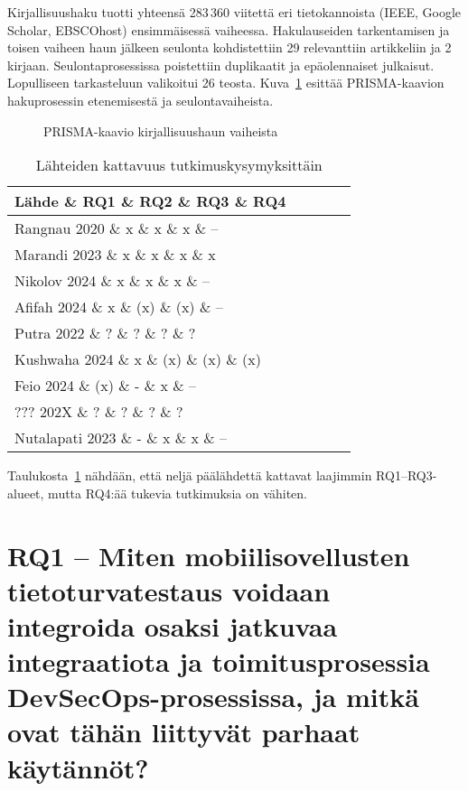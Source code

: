 \documentclass[bscthesis,finnish,oneside,biblatex]{uefcsthesis}
\begin{document}
Kirjallisuushaku tuotti yhteensä 283\,360 viitettä eri tietokannoista (IEEE, Google Scholar, EBSCOhost) ensimmäisessä vaiheessa.
Hakulauseiden tarkentamisen ja toisen vaiheen haun jälkeen seulonta kohdistettiin 29 relevanttiin artikkeliin ja 2 kirjaan.
Seulontaprosessissa poistettiin duplikaatit ja epäolennaiset julkaisut. Lopulliseen tarkasteluun valikoitui 26 teosta.
Kuva~\ref{fig:prisma} esittää PRISMA-kaavion hakuprosessin etenemisestä ja seulontavaiheista.


\begin{figure}[h]
  \centering
  \caption{PRISMA-kaavio kirjallisuushaun vaiheista}
  \label{fig:prisma}
\end{figure}

\begin{table}[h]
  \caption{Lähteiden kattavuus tutkimuskysymyksittäin}
  \label{tab:rq_matrix}
  \footnotesize
  \begin{tabular}{lcccc}
    \toprule
    Lähde \& RQ1 \& RQ2 \& RQ3 \& RQ4 \\
    \midrule
    Rangnau 2020 \& x \& x \& x \& – \\
    Marandi 2023 \& x \& x \& x \& x \\
    Nikolov 2024 \& x \& x \& x \& – \\
    Afifah 2024  \& x \& (x) \& (x) \& – \\
    Putra 2022  \& ? \& ? \& ? \& ? \\
    Kushwaha 2024  \& x \& (x) \& (x) \& (x) \\
    Feio  2024  \& (x) \& - \& x \& – \\
    ??? 202X   \& ? \& ? \& ? \& ? \\
    Nutalapati 2023  \& - \& x \& x \& – \\
    \bottomrule
  \end{tabular}
\end{table}

Taulukosta~\ref{tab:rq_matrix} nähdään, että neljä päälähdettä
kattavat laajimmin RQ1–RQ3-alueet, mutta RQ4:ää tukevia tutkimuksia on
vähiten.

\section{RQ1 – Miten mobiilisovellusten tietoturvatestaus voidaan integroida osaksi jatkuvaa integraatiota ja toimitusprosessia DevSecOps-prosessissa, ja mitkä ovat tähän liittyvät parhaat käytännöt?}
\label{sec:rq1}
\end{document}
